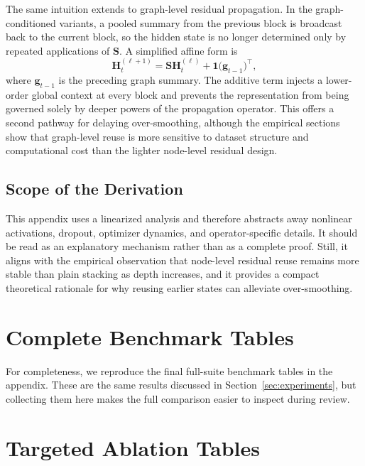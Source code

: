 The same intuition extends to graph-level residual propagation. In the graph-conditioned variants, a pooled summary from the previous block is broadcast back to the current block, so the hidden state is no longer determined only by repeated applications of $\mathbf{S}$. A simplified affine form is
\begin{equation}
\mathbf{H}_{t}^{(\ell+1)} = \mathbf{S}\mathbf{H}_{t}^{(\ell)} + \mathbf{1}\bigl(\mathbf{g}_{t-1}\bigr)^{\top},
\end{equation}
where $\mathbf{g}_{t-1}$ is the preceding graph summary. The additive term injects a lower-order global context at every block and prevents the representation from being governed solely by deeper powers of the propagation operator. This offers a second pathway for delaying over-smoothing, although the empirical sections show that graph-level reuse is more sensitive to dataset structure and computational cost than the lighter node-level residual design.

\subsection{Scope of the Derivation}

This appendix uses a linearized analysis and therefore abstracts away nonlinear activations, dropout, optimizer dynamics, and operator-specific details. It should be read as an explanatory mechanism rather than as a complete proof. Still, it aligns with the empirical observation that node-level residual reuse remains more stable than plain stacking as depth increases, and it provides a compact theoretical rationale for why reusing earlier states can alleviate over-smoothing.

\section{Complete Benchmark Tables}
\label{app:full_tables}

For completeness, we reproduce the final full-suite benchmark tables in the appendix. These are the same results discussed in Section~\ref{sec:experiments}, but collecting them here makes the full comparison easier to inspect during review.


\FloatBarrier

\section{Targeted Ablation Tables}
\label{app:targeted_ablations}

